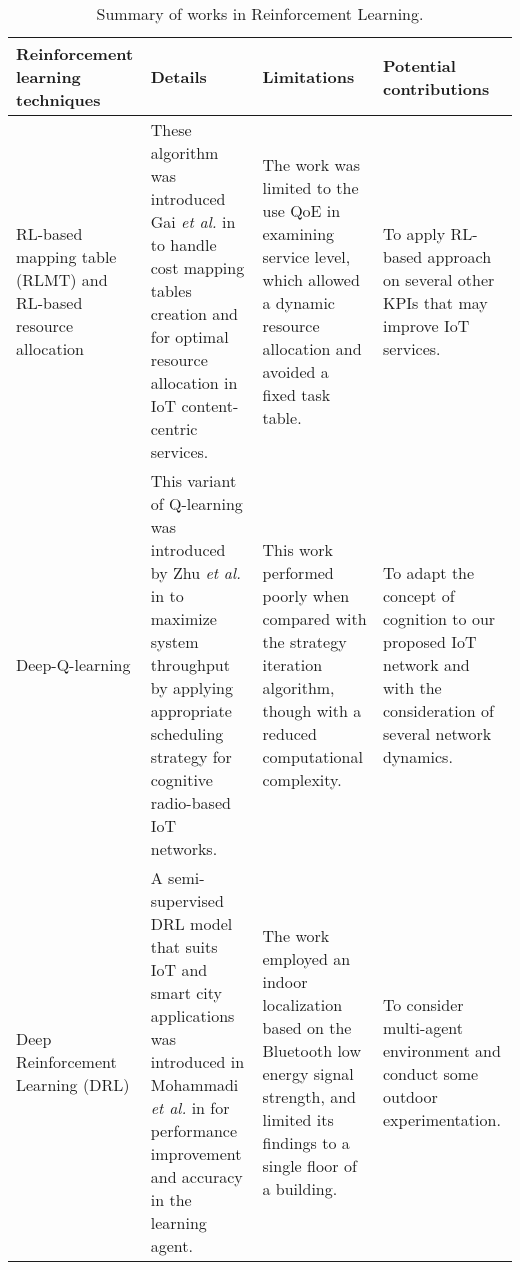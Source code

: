 \documentclass[journal]{IEEEtran}
\begin{document}
\pagestyle{empty}
\begin{landscape}



\renewcommand{\arraystretch}{1.2}


\begin{table}
\small
\centering
\caption{Summary of works in Reinforcement Learning.}


\centering

\label{table:review}
\begin{tabular}{llll}


  \hline
    Reinforcement learning techniques & Details  & Limitations & Potential contributions \\
  \hline \hline
  \multicolumn{1}{m{3cm}}{RL-based mapping table (RLMT) and RL-based resource allocation} & \multicolumn{1}{m{6cm}}{These algorithm was introduced Gai \emph{et al.} in \cite{Gai2018} to handle cost mapping tables creation and for optimal resource allocation in IoT content-centric services.} & \multicolumn{1}{m{6cm}}{The work was limited to the use QoE in examining service level, which allowed a dynamic resource allocation and avoided a fixed task table.} & \multicolumn{1}{m{6cm}}{To apply RL-based approach on several other KPIs that may improve IoT services.}\\ \hline

\multicolumn{1}{m{3cm}}{Deep-Q-learning} & \multicolumn{1}{m{6cm}}{This variant of Q-learning was introduced by Zhu \emph{et al.} in \cite{Zhu2018} to maximize system throughput by applying appropriate scheduling strategy for cognitive radio-based IoT networks.} & \multicolumn{1}{m{6cm}}{This work performed poorly when compared with the strategy iteration algorithm, though with a reduced computational complexity.} & \multicolumn{1}{m{6cm}}{To adapt the concept of cognition to our proposed IoT network and with the consideration of several network dynamics.}\\ \hline


\multicolumn{1}{m{3cm}}{Deep Reinforcement Learning (DRL)} & \multicolumn{1}{m{6cm}}{A semi-supervised DRL model that suits IoT and smart city applications was introduced in Mohammadi \emph{et al.} in \cite{Mohammadi2018} for performance improvement and accuracy in the learning agent.} & \multicolumn{1}{m{6cm}}{The work employed an indoor localization based on the Bluetooth low energy signal strength, and limited its findings to a single floor of a building.} & \multicolumn{1}{m{6cm}}{To consider multi-agent environment and conduct some outdoor experimentation.}\\ \hline



\end{tabular}
\end{table}
\end{landscape}
\end{document}
